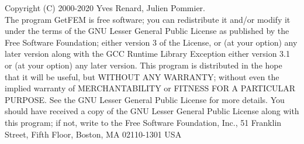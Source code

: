 Copyright (C) 2000-2020 Yves Renard, Julien Pommier.\\
The program GetFEM is free software; you can redistribute it and/or modify
it under the terms of the GNU Lesser General Public License as published by
the Free Software Foundation; either version 3 of the License, or
(at your option) any later version along with the GCC Runtime Library
Exception either version 3.1 or (at your option) any later version.
This program is distributed in the hope that it will be useful,
but WITHOUT ANY WARRANTY; without even the implied warranty of
MERCHANTABILITY or FITNESS FOR A PARTICULAR PURPOSE.  See the
GNU Lesser General Public License for more details.
You should have received a copy of the GNU  Lesser General Public License
along with this program; if not, write to the Free Software Foundation,
Inc., 51 Franklin Street, Fifth Floor, Boston, MA  02110-1301  USA
